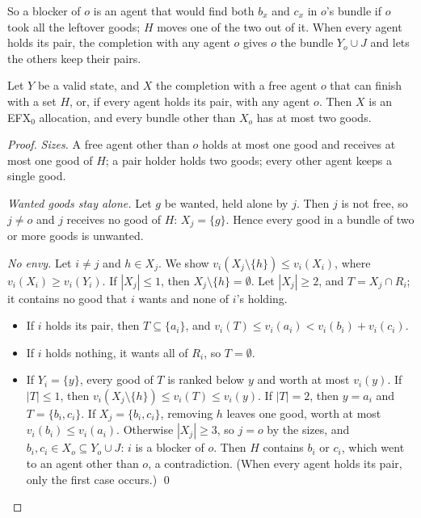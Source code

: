 \documentclass[runningheads,11pt]{llncs}
\newcommand{\efxz}{\texorpdfstring{\mbox{EFX$_0$}}{EFX0}}
\begin{document}
\noindent So a blocker of $o$ is an agent that would find both $b_x$ and $c_x$ in $o$'s bundle if $o$ took all the leftover goods; $H$ moves one of the two out of it. When every agent holds its pair, the completion with any agent $o$ gives $o$ the bundle $Y_o\cup J$ and lets the others keep their pairs.

\begin{theorem}[soundness]\label{thm:sound}
Let $Y$ be a valid state, and $X$ the completion with a free agent $o$ that can finish with a set $H$, or, if every agent holds its pair, with any agent $o$. Then $X$ is an \efxz{} allocation, and every bundle other than $X_o$ has at most two goods.
\end{theorem}

\begin{proof}
\emph{Sizes.} A free agent other than $o$ holds at most one good and receives at most one good of $H$; a pair holder holds two goods; every other agent keeps a single good.

\emph{Wanted goods stay alone.} Let $g$ be wanted, held alone by $j$. Then $j$ is not free, so $j\ne o$ and $j$ receives no good of $H$: $X_j=\{g\}$. Hence every good in a bundle of two or more goods is unwanted.

\emph{No envy.} Let $i\ne j$ and $h\in X_j$. We show $v_i(X_j\setminus\{h\})\le v_i(X_i)$, where $v_i(X_i)\ge v_i(Y_i)$. If $|X_j|\le1$, then $X_j\setminus\{h\}=\emptyset$. Let $|X_j|\ge2$, and $T=X_j\cap R_i$; it contains no good that $i$ wants and none of $i$'s holding.
\begin{itemize}
\item If $i$ holds its pair, then $T\subseteq\{a_i\}$, and $v_i(T)\le v_i(a_i)<v_i(b_i)+v_i(c_i)$.
\item If $i$ holds nothing, it wants all of $R_i$, so $T=\emptyset$.
\item If $Y_i=\{y\}$, every good of $T$ is ranked below $y$ and worth at most $v_i(y)$. If $|T|\le1$, then $v_i(X_j\setminus\{h\})\le v_i(T)\le v_i(y)$. If $|T|=2$, then $y=a_i$ and $T=\{b_i,c_i\}$. If $X_j=\{b_i,c_i\}$, removing $h$ leaves one good, worth at most $v_i(b_i)\le v_i(a_i)$. Otherwise $|X_j|\ge3$, so $j=o$ by the sizes, and $b_i,c_i\in X_o\subseteq Y_o\cup J$: $i$ is a blocker of $o$. Then $H$ contains $b_i$ or $c_i$, which went to an agent other than $o$, a contradiction. (When every agent holds its pair, only the first case occurs.) \qed
\end{itemize}
\end{proof}
\end{document}
